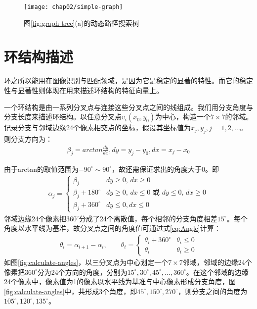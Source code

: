\begin{figure}
\centering
\texttt{[image: chap02/simple-graph]}
\caption{图\ref{fig:graph-tree}(a)的动态路径搜索树}
\label{fig:simple-tree}
\end{figure}


\section{环结构描述}
\label{}
环之所以能用在图像识别与匹配领域，是因为它是稳定的显著的特性。而它的稳定性与显著性则体现在用来描述环结构的特征向量上。

一个环结构是由一系列分叉点与连接这些分叉点之间的线组成。我们用分支角度与分支长度来描述环结构。以任意分叉点$v_i(x_0, y_0)$为中心，构造一个$7 \times 7$的邻域。记录分支与邻域边缘24个像素相交点的坐标，假设其坐标值为$x_j, y_j, j=1, 2, \ldots$。则分支方向为：
\begin{align}
\beta_j = arctan\frac{dy}{dx}, dy = y_j - y_0, dx = x_j - x_0 
\end{align}

由于arctan的取值范围为$-90^{\circ} \sim 90^{\circ}$，故还需保证求出的角度大于0。即
\begin{align}
\alpha_j = \left\{ \begin{array}{ll}
\beta_j & \textrm{$dy \geq 0$, $dx \geq 0$} \\
\beta_j + 180^{\circ} & \textrm{$dy \geq 0$, $dx \leq 0$ 或 $dy \leq 0$, $dx \geq 0$}\\
\beta_j + 360^{\circ} & \textrm{$dy \leq 0, dx \leq 0$}
\end{array} \right.
\end{align}
邻域边缘24个像素把$360^{\circ}$分成了24个离散值，每个相邻的分支角度相差$15^{\circ}$。每个角度以水平线为基准，故分叉点之间的角度值可通过式\ref{eq:Angle}计算：
\begin{align}
\theta_i = \alpha_{i+1} - \alpha_i, \qquad
\theta_i = \left\{ \begin{array}{ll}
\theta_i + 360^{\circ} & \theta_i \le 0 \\
\theta_i & \theta_i \geq 0
\end{array} \right.
\label{eq:Angle}
\end{align}
如图\ref{fig:calculate-angles}，以三分叉点为中心划定一个$7\times7$邻域，邻域的边缘24个像素把$360^{\circ}$分为24个方向的角度，分别为$15^{\circ}, 30^{\circ},45^{\circ}, \ldots, 360^{\circ}$。在这个邻域的边缘24个像素中，像素值为1的像素以水平线为基准与中心像素形成分支角度，图\ref{fig:calculate-angles}中，共形成3个角度，即$45^{\circ}, 150^{\circ},270^{\circ}$，则分支之间的角度为$105^{\circ}, 120^{\circ}, 135^{\circ}$。

